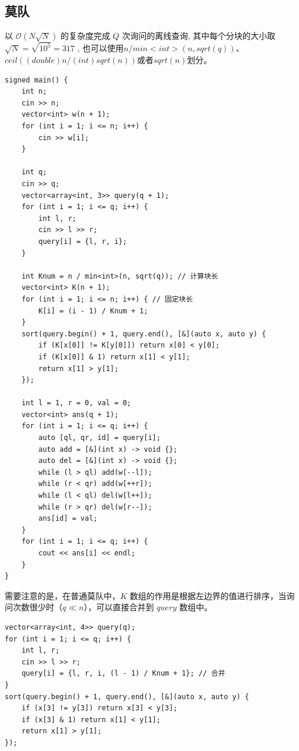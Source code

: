 \subsection{莫队}
以 $\mathcal O(N \sqrt N)$ 的复杂度完成 $Q$ 次询问的离线查询,
其中每个分块的大小取 $\sqrt N=\sqrt {10^5} = 317$ ,
也可以使用$n / min<int>(n, sqrt(q))$、 $ceil((double)n / (int)sqrt(n))$或者$sqrt(n)$划分。
\begin{lstlisting}[caption={}]
signed main() {
    int n;
    cin >> n;
    vector<int> w(n + 1);
    for (int i = 1; i <= n; i++) {
        cin >> w[i];
    }
    
    int q;
    cin >> q;
    vector<array<int, 3>> query(q + 1);
    for (int i = 1; i <= q; i++) {
        int l, r;
        cin >> l >> r;
        query[i] = {l, r, i};
    }
    
    int Knum = n / min<int>(n, sqrt(q)); // 计算块长
    vector<int> K(n + 1);
    for (int i = 1; i <= n; i++) { // 固定块长
        K[i] = (i - 1) / Knum + 1;
    }
    sort(query.begin() + 1, query.end(), [&](auto x, auto y) {
        if (K[x[0]] != K[y[0]]) return x[0] < y[0];
        if (K[x[0]] & 1) return x[1] < y[1];
        return x[1] > y[1];
    });
    
    int l = 1, r = 0, val = 0;
    vector<int> ans(q + 1);
    for (int i = 1; i <= q; i++) {
        auto [ql, qr, id] = query[i];
        auto add = [&](int x) -> void {};
        auto del = [&](int x) -> void {};
        while (l > ql) add(w[--l]);
        while (r < qr) add(w[++r]);
        while (l < ql) del(w[l++]);
        while (r > qr) del(w[r--]);
        ans[id] = val;
    }
    for (int i = 1; i <= q; i++) {
        cout << ans[i] << endl;
    }
}
\end{lstlisting}

需要注意的是，在普通莫队中，$K$ 数组的作用是根据左边界的值进行排序，当询问次数很少时（$q \ll n$），可以直接合并到 $query$ 数组中。
\begin{lstlisting}[caption={}]
vector<array<int, 4>> query(q);
for (int i = 1; i <= q; i++) {
    int l, r;
    cin >> l >> r;
    query[i] = {l, r, i, (l - 1) / Knum + 1}; // 合并
}
sort(query.begin() + 1, query.end(), [&](auto x, auto y) {
    if (x[3] != y[3]) return x[3] < y[3];
    if (x[3] & 1) return x[1] < y[1];
    return x[1] > y[1];
});
\end{lstlisting}


